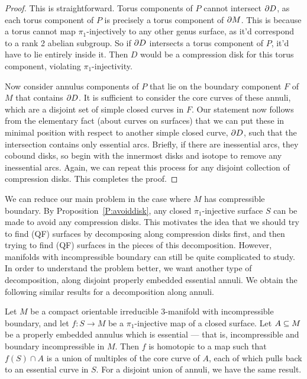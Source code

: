 \begin{proof}

This is straightforward. Torus components of $P$ cannot intersect $\partial D$, as
each torus component of $P$ is precisely a torus component of $\partial M$. This is
because a torus cannot map $\pi_1$-injectively to any other genus surface, as
it'd correspond to a rank 2 abelian subgroup. So if $\partial D$ intersects a torus
component of $P$, it'd have to lie entirely inside it. Then $D$ would be
a compression disk for this torus component, violating $\pi_1$-injectivity.

Now consider annulus components of $P$ that lie on the boundary component $F$
of $M$ that contains $\partial D$. It is sufficient to consider the core curves of
these annuli, which are a disjoint set of simple closed curves in $F$. Our
statement now follows from the elementary fact (about curves on surfaces) that
we can put these in minimal position with respect to another simple closed
curve, $\partial D$, such that the intersection contains only essential arcs.
Briefly, if there are inessential arcs, they cobound disks, so begin with the
innermost disks and isotope to remove any inessential arcs. Again, we can
repeat this process for any disjoint collection of compression disks. This
completes the proof.

\end{proof}

We can reduce our main problem in the case where $M$ has compressible boundary.
By Proposition~\ref{P:avoiddisk}, any closed $\pi_1$-injective surface $S$ can
be made to avoid any compression disks. This motivates the idea that we should
try to find (QF) surfaces by decomposing along compression disks first, and
then trying to find (QF) surfaces in the pieces of this decomposition. However,
manifolds with incompressible boundary can still be quite complicated to study.
In order to understand the problem better, we want another type of
decomposition, along disjoint properly embedded essential annuli. We obtain the
following similar results for a decomposition along annuli.

\begin{prop}

Let $M$ be a compact orientable irreducible $3$-manifold with incompressible
boundary, and let $f \colon S \to M$ be a $\pi_1$-injective map of a closed
surface. Let $A \subseteq M$ be a properly embedded annulus which is essential ---
that is, incompressible and boundary incompressible in $M$. Then $f$ is
homotopic to a map such that $f(S) \cap A$ is a union of multiples of the core
curve of $A$, each of which pulls back to an essential curve in $S$.  For
a disjoint union of annuli, we have the same result.

\end{prop}

